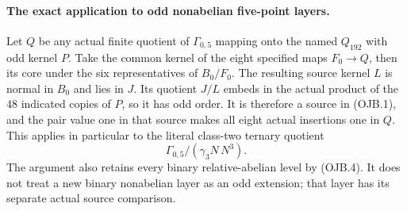 \paragraph{The exact application to odd nonabelian five-point layers.}
Let $Q$ be any actual finite quotient of $\Gamma_{0,5}$
mapping onto the named $Q_{192}$ with odd kernel $P$.
Take the common kernel of the eight specified maps
$F_0\to Q$, then its core under the six representatives
of $B_0/F_0$. The resulting source kernel $L$ is
normal in $B_0$ and lies in $J$. Its quotient $J/L$
embeds in the actual product of the $48$ indicated
copies of $P$, so it has odd order.
It is therefore a source in (OJB.1), and the pair value
one in that source makes all eight actual insertions
one in $Q$.
This applies in particular to the literal class-two
ternary quotient
\[
                 \Gamma_{0,5}/(\gamma_3N\,N^3).
                                                        \tag{OJB.5}
\]
The argument also retains every binary relative-abelian
level by (OJB.4). It does not treat a new binary
nonabelian layer as an odd extension; that layer has
its separate actual source comparison.
